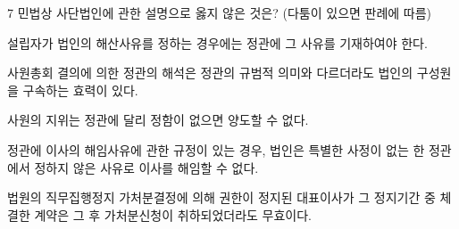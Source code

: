 \begin{question}{7}
민법상 사단법인에 관한 설명으로 옳지 않은 것은? (다툼이 있으면 판례에 따름)
\begin{choices}
  \item 설립자가 법인의 해산사유를 정하는 경우에는 정관에 그 사유를 기재하여야 한다.
  \item 사원총회 결의에 의한 정관의 해석은 정관의 규범적 의미와 다르더라도 법인의 구성원을 구속하는 효력이 있다.
  \item 사원의 지위는 정관에 달리 정함이 없으면 양도할 수 없다.
  \item 정관에 이사의 해임사유에 관한 규정이 있는 경우, 법인은 특별한 사정이 없는 한 정관에서 정하지 않은 사유로 이사를 해임할 수 없다.
  \item 법원의 직무집행정지 가처분결정에 의해 권한이 정지된 대표이사가 그 정지기간 중 체결한 계약은 그 후 가처분신청이 취하되었더라도 무효이다.
\end{choices}
\end{question}
